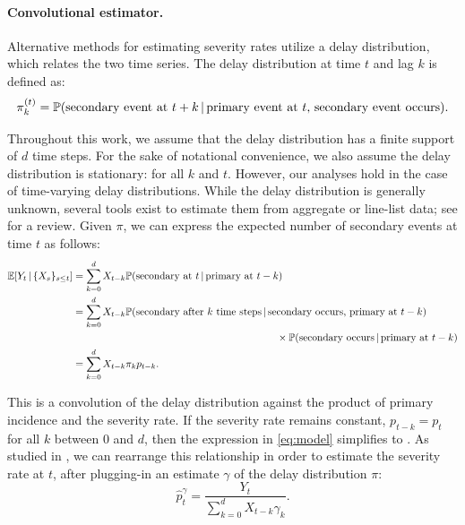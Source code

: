 \documentclass{article}
\renewcommand{\hat}{\widehat} %
\newcommand{\given}{\, \vert \,}
\begin{document}
\paragraph{Convolutional estimator.} 

Alternative methods for estimating severity rates utilize a delay distribution,
which relates the two time series. The delay distribution at time $t$ and lag
$k$ is defined as: 
\[
\pi_k^{(t)} = \P(\text{secondary event at $t+k$} \given \text{primary event at
  $t$, secondary event occurs}).  
\]

Throughout this work, we assume that the delay distribution has a finite support
of $d$ time steps. 
For the sake of notational convenience, we also assume the delay distribution is stationary:
 for all $k$ and $t$. 
However, our analyses hold in the case of time-varying delay distributions.
While the delay distribution is generally unknown,
several tools exist to estimate them from aggregate or line-list data; see
\citealp{delay_distrs} for a review. Given $\pi$, we can express the
expected number of secondary events at time $t$ as follows: 
\begin{align}
\E[Y_t \given \{X_s\}_{s\leq t}]
&= \sum_{k=0}^d X_{t-k} \P(\text{secondary at $t$} \given \text{primary at
  $t-k$}) \nonumber \\   
&= \sum_{k=0}^d X_{t-k} \P(\text{secondary after $k$ time steps} \given
  \text{secondary occurs, primary at $t-k$}) \nonumber \\
&\hspace{200pt} \times\P(\text{secondary occurs} \given\text{primary at $t-k$})
  \nonumber \\  
\label{eq:model}
&= \sum_{k=0}^d X_{t-k} \pi_k p_{t-k}.
\end{align}

This is a convolution of the delay distribution against the product of primary
incidence and the severity rate. If the severity rate remains constant, $p_{t-k}
= p_t$ for all $k$ between $0$ and $d$, then the expression in \eqref{eq:model}
simplifies to \smash{$\E[Y_t \given \{X_s\}_{s\leq t}] = p_t \sum_{k=0}^d
  X_{t-k} \pi_k$}. As studied in \citet{UKpaper}, we can rearrange this
relationship in order to estimate the severity rate at $t$, after plugging-in an
estimate $\gamma$ of the delay distribution $\pi$:   
\begin{equation}
\label{eq:conv}
\hat{p}_t^\gamma = \frac{Y_t}{\sum_{k=0}^d X_{t-k} \gamma_k}.
\end{equation}
\end{document}

